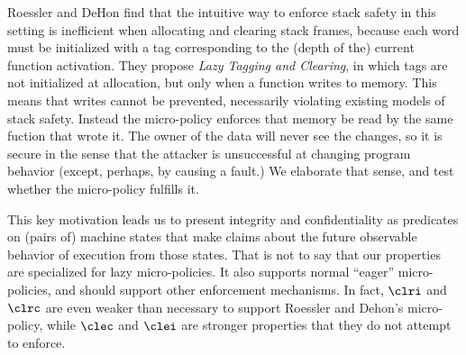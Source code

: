 Roessler and DeHon find that the intuitive way to enforce stack safety in this setting
is inefficient when allocating and clearing stack frames, because each word must be initialized
with a tag corresponding to the (depth of the) current function activation. They propose
{\em Lazy Tagging and Clearing}, in which tags are not initialized at allocation, but only
when a function writes to memory. This means that writes cannot be prevented, necessarily
violating existing models of stack safety. Instead the micro-policy enforces that memory be
read by the same fuction that wrote it. The owner of the data will never see the changes,
so it is secure in the sense that the attacker is unsuccessful at changing program behavior
(except, perhaps, by causing a fault.) We elaborate that sense, and test whether the
micro-policy fulfills it.

This key motivation leads us to present integrity and confidentiality as predicates on (pairs of)
machine states that make claims about the future observable behavior of execution from those states.
That is not to say that our properties are specialized for lazy micro-policies. It also supports
normal ``eager'' micro-policies, and should support other enforcement mechanisms. In fact, \(\clri\)
and \(\clrc\) are even weaker than necessary to support Roessler and Dehon's micro-policy,
while \(\clec\) and \(\clei\) are stronger properties that they do not attempt to enforce.
%

